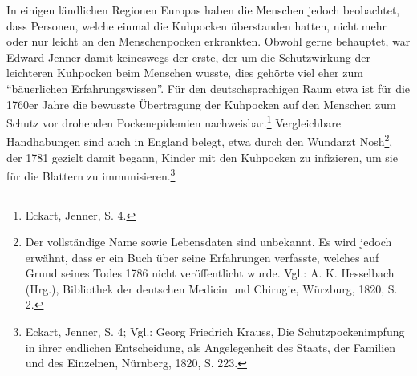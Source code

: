 \documentclass[
    a4paper,
    12pt,
    hyphens,
    chapterprefix=true,
    headheight=33pt,
    footheight=29pt,
    headings=optiontohead, %
]{scrartcl}
\begin{document}
In einigen ländlichen Regionen Europas haben die Menschen jedoch beobachtet, dass Personen, welche einmal die Kuhpocken überstanden hatten, nicht mehr oder nur leicht an den Menschenpocken erkrankten. Obwohl gerne behauptet, war Edward Jenner damit keineswegs der erste, der um die Schutzwirkung der leichteren Kuhpocken beim Menschen wusste, dies gehörte viel eher zum "`bäuerlichen Erfahrungswissen"'. Für den deutschsprachigen Raum etwa ist für die 1760er Jahre die bewusste Übertragung der Kuhpocken auf den Menschen zum Schutz vor drohenden Pockenepidemien nachweisbar.\footnote{Eckart, Jenner, S. 4.} Vergleichbare Handhabungen sind auch in England belegt, etwa durch den Wundarzt Nosh\footnote{Der vollständige Name sowie Lebensdaten sind unbekannt. Es wird jedoch erwähnt, dass er ein Buch über seine Erfahrungen verfasste, welches auf Grund seines Todes 1786 nicht veröffentlicht wurde. Vgl.: A. K. Hesselbach (Hrg.), Bibliothek der deutschen Medicin und Chirugie, Würzburg, 1820, S. 2.}, der 1781 gezielt damit begann, Kinder mit den Kuhpocken zu infizieren, um sie für die Blattern zu immunisieren.\footnote{Eckart, Jenner, S. 4; Vgl.: Georg Friedrich Krauss, Die Schutzpockenimpfung in ihrer endlichen Entscheidung, als Angelegenheit des Staats, der Familien und des Einzelnen, Nürnberg, 1820, S. 223.} \\
\end{document}
